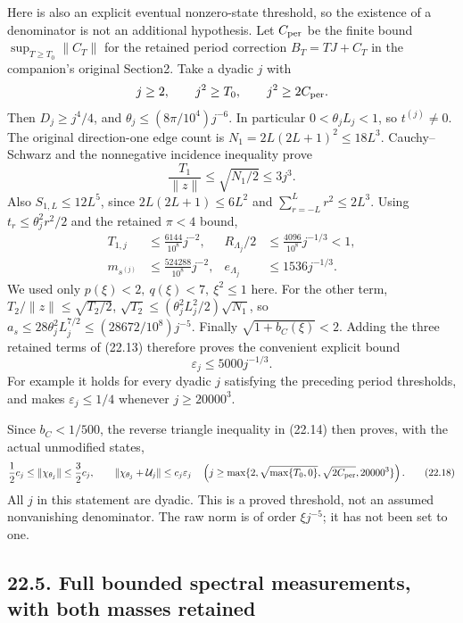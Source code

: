 \documentclass[
]{article}
\begin{document}
Here is also an explicit eventual nonzero-state threshold, so the
existence of a denominator is not an additional hypothesis. Let
\(C_{\rm per}\) be the finite bound \(\sup_{T\ge T_0}\|C_T\|\) for the
retained period correction \(B_T=TJ+C_T\) in the companion's original
Section2. Take a dyadic \(j\) with \[
j\ge2,\qquad j^2\ge T_0,\qquad j^2\ge2C_{\rm per}.
\] Then \(D_j\ge j^4/4\), and \(\theta_j\le(8\pi/10^4)j^{-6}\). In
particular \(0<\theta_jL_j<1\), so \(t^{(j)}\ne0\). The original
direction-one edge count is \(N_1=2L(2L+1)^2\le18L^3\). Cauchy--Schwarz
and the nonnegative incidence inequality prove \[
\frac{T_1}{\|z\|}\le\sqrt{N_1/2}\le3j^3 .
\] Also \(S_{1,L}\le12L^5\), since \(2L(2L+1)\le6L^2\) and
\(\sum_{r=-L}^Lr^2\le2L^3\). Using \(t_r\le\theta_j^2r^2/2\) and the
retained \(\pi<4\) bound, \[
\begin{aligned}
T_{1,j}&\le\frac{6144}{10^8}j^{-2},&
R_{\Lambda_j}/2&\le\frac{4096}{10^8}j^{-1/3}<1,\\
m_{s^{(j)}}&\le\frac{524288}{10^8}j^{-2},&
e_{\Lambda_j}&\le1536j^{-1/3}.
\end{aligned}
\] We used only \(p(\xi)<2,\ q(\xi)<7,\ \xi^2\le1\) here. For the other
term, \(T_2/\|z\|\le\sqrt{T_2/2}\),
\(\sqrt{T_2}\le(\theta_j^2L_j^2/2)\sqrt{N_1}\), so
\(a_s\le28\theta_j^2L_j^{7/2}
 \le(28672/10^8)j^{-5}\). Finally \(\sqrt{1+b_C(\xi)}<2\). Adding the
three retained terms of (22.13) therefore proves the convenient explicit
bound \[
\varepsilon_j\le5000j^{-1/3}.                                \tag{22.17}
\] For example it holds for every dyadic \(j\) satisfying the preceding
period thresholds, and makes \(\varepsilon_j\le1/4\) whenever
\(j\ge20000^3\).

Since \(b_C<1/500\), the reverse triangle inequality in (22.14) then
proves, with the actual unmodified states, \[
\frac12c_j\le\|\chi_{\theta_j}\|\le\frac32c_j,
\qquad
\|\chi_{\theta_j}+\mathcal U_j\|\le c_j\varepsilon_j
\quad
\left(j\ge\max\{2,\sqrt{\max\{T_0,0\}},\sqrt{2C_{\rm per}},20000^3\}\right).
                                                               \tag{22.18}
\] All \(j\) in this statement are dyadic. This is a proved threshold,
not an assumed nonvanishing denominator. The raw norm is of order
\(\xi j^{-5}\); it has not been set to one.

\subsection{22.5. Full bounded spectral measurements, with both masses
retained}\label{full-bounded-spectral-measurements-with-both-masses-retained}
\end{document}
